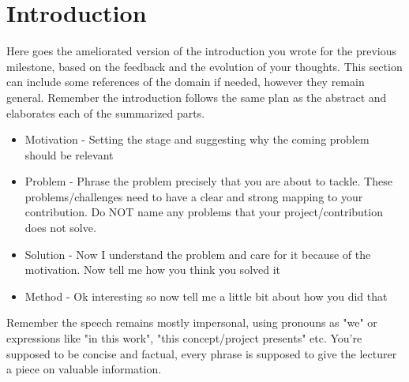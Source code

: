 \section{Introduction}
Here goes the ameliorated version of the introduction you wrote for the previous milestone, based on the feedback and the evolution of your thoughts. This section can include some references of the domain if needed, however they remain general.
Remember the introduction follows the same plan as the abstract and elaborates each of the summarized parts. 
\begin{itemize}
    \item Motivation - Setting the stage and suggesting why the coming problem should be relevant
    \item Problem - Phrase the problem precisely that you are about to tackle. These problems/challenges need to have a clear and strong mapping to your contribution. Do NOT name any problems that your project/contribution does not solve.
    \item Solution - Now I understand the problem and care for it because of the motivation. Now tell me how you think you solved it
    \item Method - Ok interesting so now tell me a little bit about how you did that 
\end{itemize}

Remember the speech remains mostly impersonal, using pronouns as "we" or expressions like "in this work", "this concept/project presents" etc. You're supposed to be concise and factual, every phrase is supposed to give the lecturer a piece on valuable information.
